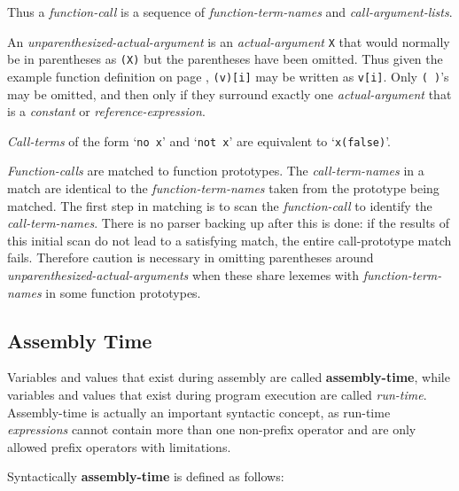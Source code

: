 \documentclass[12pt]{article}
\newcommand{\key}[1]{{\rm \bfseries #1}}
\begin{document}
Thus a {\em function-call} is a sequence of {\em function-term-names}
and {\em call-argument-lists}.

An {\em unparenthesized-actual-argument} is an {\em actual-argument}
{\tt X} that would normally be in parentheses as {\tt (X)} but the
parentheses have been omitted.  Thus given the example function definition
on page \pageref{REFERENCE-EXPRESSION-FUNCTION-EXAMPLE},
{\tt (v)[i]} may be written as {\tt v[i]}.  Only {\tt (~)}'s may be
omitted, and then only if they surround exactly one {\em actual-argument}
that is a {\em constant} or {\em reference-expression}.

{\em Call-terms} of the form `{\tt no x}' and `{\tt not x}' are
equivalent to `{\tt x(false)}'.

{\em Function-calls} are matched to function prototypes.  The
{\em call-term-names} in a match are identical to the
{\em function-term-names} taken from the prototype being matched.  The first
step in matching is to scan the {\em function-call} to identify the
{\em call-term-names}.  There is no parser backing up after this is
done: if the results of this initial scan do not lead to a satisfying
match, the entire call-prototype match fails.  Therefore caution
is necessary in omitting parentheses around
{\em unparenthesized-actual-arguments} when these share lexemes with
{\em function-term-names} in some function prototypes.

\subsection{Assembly Time}
\label{ASSEMBLY-TIME}

Variables and values that exist during assembly are called
\key{assembly-time}, while variables and values that exist during
program execution are called {\em run-time}.  Assembly-time
is actually an important syntactic concept, as run-time
{\em expressions} cannot contain more than one non-prefix operator
and are only allowed prefix operators with limitations.

Syntactically \key{assembly-time} is defined as follows:
\end{document}
